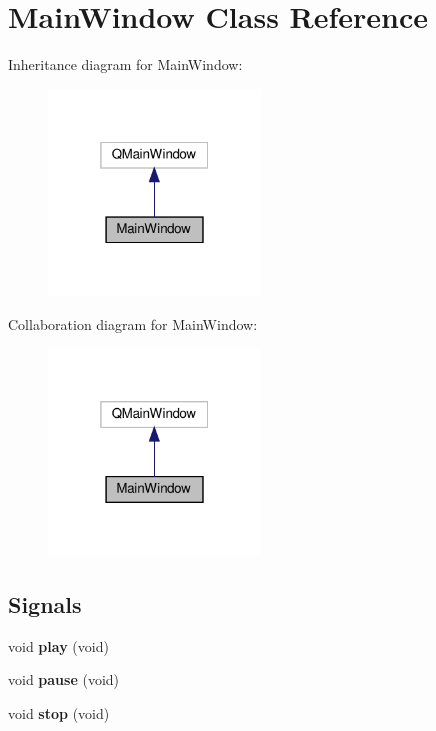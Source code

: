 \hypertarget{classMainWindow}{}\section{Main\+Window Class Reference}
\label{classMainWindow}


Inheritance diagram for Main\+Window\+:\nopagebreak
\begin{figure}[H]
\begin{center}
\leavevmode
\includegraphics[width=160pt]{classMainWindow__inherit__graph}
\end{center}
\end{figure}


Collaboration diagram for Main\+Window\+:\nopagebreak
\begin{figure}[H]
\begin{center}
\leavevmode
\includegraphics[width=160pt]{classMainWindow__coll__graph}
\end{center}
\end{figure}
\subsection*{Signals}
\begin{DoxyCompactItemize}
\item 
\mbox{\label{classMainWindow_a8981ec6b1564821c10b2db484556c335}} 
void {\bfseries play} (void)
\item 
\mbox{\label{classMainWindow_ad36b52312116711a1c0e88917b07cea3}} 
void {\bfseries pause} (void)
\item 
\mbox{\label{classMainWindow_a003efa6afe9f5cb7c0bc73dada912e80}} 
void {\bfseries stop} (void)
\end{DoxyCompactItemize}

